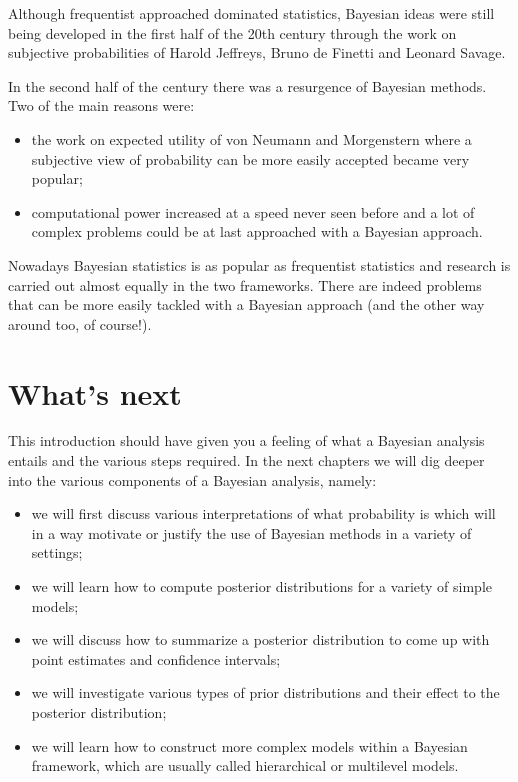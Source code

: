 \documentclass[
]{book}
\begin{document}
Although frequentist approached dominated statistics, Bayesian ideas were still being developed in the first half of the 20th century through the work on subjective probabilities of Harold Jeffreys, Bruno de Finetti and Leonard Savage.

In the second half of the century there was a resurgence of Bayesian methods. Two of the main reasons were:

\begin{itemize}
\item
  the work on expected utility of von Neumann and Morgenstern where a subjective view of probability can be more easily accepted became very popular;
\item
  computational power increased at a speed never seen before and a lot of complex problems could be at last approached with a Bayesian approach.
\end{itemize}

Nowadays Bayesian statistics is as popular as frequentist statistics and research is carried out almost equally in the two frameworks. There are indeed problems that can be more easily tackled with a Bayesian approach (and the other way around too, of course!).

\hypertarget{whats-next}{%
\section{What's next}\label{whats-next}}

This introduction should have given you a feeling of what a Bayesian analysis entails and the various steps required. In the next chapters we will dig deeper into the various components of a Bayesian analysis, namely:

\begin{itemize}
\item
  we will first discuss various interpretations of what probability is which will in a way motivate or justify the use of Bayesian methods in a variety of settings;
\item
  we will learn how to compute posterior distributions for a variety of simple models;
\item
  we will discuss how to summarize a posterior distribution to come up with point estimates and confidence intervals;
\item
  we will investigate various types of prior distributions and their effect to the posterior distribution;
\item
  we will learn how to construct more complex models within a Bayesian framework, which are usually called hierarchical or multilevel models.
\end{itemize}

  
\end{document}
